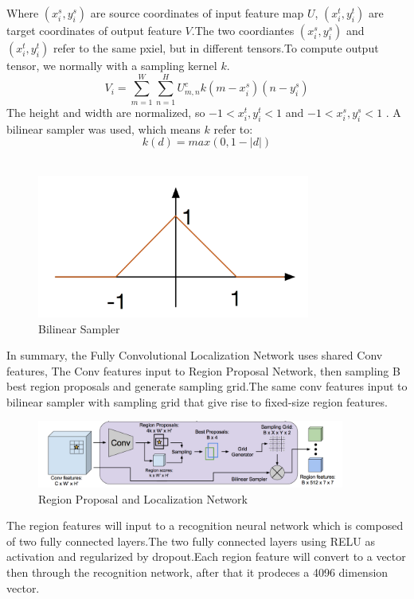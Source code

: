 \documentclass[12pt,a4paper]{report}
\begin{document}
Where $(x_i^s,y_i^s)$ are source coordinates of input feature map $U$, $(x_i^t,y_i^t)$ are target coordinates of output feature $V$.The two coordiantes $(x_i^s,y_i^s)$ and $(x_i^t,y_i^t)$ refer to the same pxiel, but in different tensors.To compute output tensor, we normally with a sampling kernel $k$.
\[V_i=\sum\limits_{m=1}^W\sum\limits_{n=1}^HU_{m,n}^c k(m-x_i^s)(n-y_i^s)\]
The height and width are normalized, so $-1<x_i^t,y_i^t<1$ and $-1<x_i^s,y_i^s<1$ . A bilinear sampler was used, which means $k$ refer to:
$$k(d)=max(0,1-|d|)$$\\
\begin{figure}[h]
\centering
\includegraphics[width=0.8\textwidth]{bilinear2.png}
\caption{Bilinear Sampler}
\end{figure}

In summary, the Fully Convolutional Localization Network uses  shared  Conv features, The Conv features input to Region Proposal Network, then sampling B best region proposals and generate sampling grid.The same conv features input to bilinear sampler with sampling grid that give rise to  fixed-size region features.

\begin{figure}[h]
\centering
\includegraphics[width=0.9\textwidth]{rpn.png}
\caption{Region Proposal and Localization Network}
\end{figure}

The region features will input to a recognition neural network which is composed of  two fully connected  layers.The two fully connected layers using RELU as activation and regularized by dropout.Each region feature will convert to a vector then through the recognition network, after that it prodeces a 4096 dimension vector. \\
\end{document}
